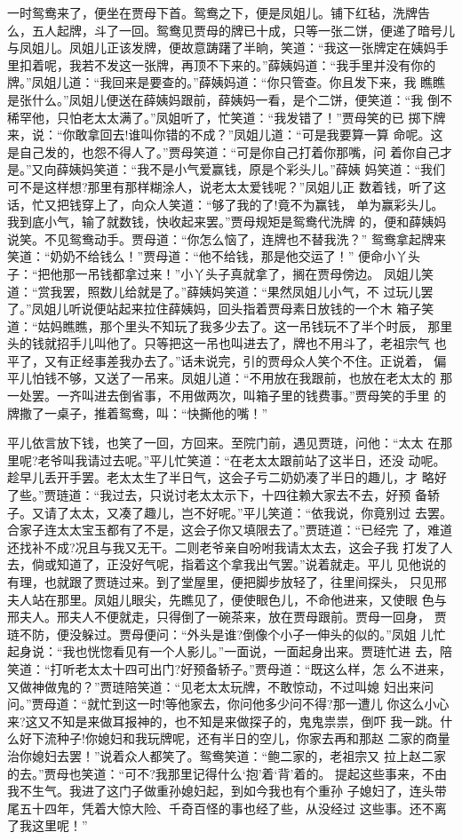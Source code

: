 一时鸳鸯来了，便坐在贾母下首。鸳鸯之下，便是凤姐儿。铺下红毡，洗牌告
么，五人起牌，斗了一回。鸳鸯见贾母的牌已十成，只等一张二饼，便递了暗号儿
与凤姐儿。凤姐儿正该发牌，便故意踌躇了半晌，笑道：“我这一张牌定在姨妈手
里扣着呢，我若不发这一张牌，再顶不下来的。”薛姨妈道：“我手里并没有你的
牌。”凤姐儿道：“我回来是要查的。”薛姨妈道：“你只管查。你且发下来，我
瞧瞧是张什么。”凤姐儿便送在薛姨妈跟前，薛姨妈一看，是个二饼，便笑道：“我
倒不稀罕他，只怕老太太满了。”凤姐听了，忙笑道：“我发错了！”贾母笑的已
掷下牌来，说：“你敢拿回去!谁叫你错的不成？”凤姐儿道：“可是我要算一算
命呢。这是自己发的，也怨不得人了。”贾母笑道：“可是你自己打着你那嘴，问
着你自己才是。”又向薛姨妈笑道：“我不是小气爱赢钱，原是个彩头儿。”薛姨
妈笑道：“我们可不是这样想?那里有那样糊涂人，说老太太爱钱呢？”凤姐儿正
数着钱，听了这话，忙又把钱穿上了，向众人笑道：“够了我的了!竟不为赢钱，
单为赢彩头儿。我到底小气，输了就数钱，快收起来罢。”贾母规矩是鸳鸯代洗牌
的，便和薛姨妈说笑。不见鸳鸯动手。贾母道：“你怎么恼了，连牌也不替我洗？”
鸳鸯拿起牌来笑道：“奶奶不给钱么！”贾母道：“他不给钱，那是他交运了！”
便命小丫头子：“把他那一吊钱都拿过来！”小丫头子真就拿了，搁在贾母傍边。
凤姐儿笑道：“赏我罢，照数儿给就是了。”薛姨妈笑道：“果然凤姐儿小气，不
过玩儿罢了。”凤姐儿听说便站起来拉住薛姨妈，回头指着贾母素日放钱的一个木
箱子笑道：“姑妈瞧瞧，那个里头不知玩了我多少去了。这一吊钱玩不了半个时辰，
那里头的钱就招手儿叫他了。只等把这一吊也叫进去了，牌也不用斗了，老祖宗气
也平了，又有正经事差我办去了。”话未说完，引的贾母众人笑个不住。正说着，
偏平儿怕钱不够，又送了一吊来。凤姐儿道：“不用放在我跟前，也放在老太太的
那一处罢。一齐叫进去倒省事，不用做两次，叫箱子里的钱费事。”贾母笑的手里
的牌撒了一桌子，推着鸳鸯，叫：“快撕他的嘴！”

平儿依言放下钱，也笑了一回，方回来。至院门前，遇见贾琏，问他：“太太
在那里呢?老爷叫我请过去呢。”平儿忙笑道：“在老太太跟前站了这半日，还没
动呢。趁早儿丢开手罢。老太太生了半日气，这会子亏二奶奶凑了半日的趣儿，才
略好了些。”贾琏道：“我过去，只说讨老太太示下，十四往赖大家去不去，好预
备轿子。又请了太太，又凑了趣儿，岂不好呢。”平儿笑道：“依我说，你竟别过
去罢。合家子连太太宝玉都有了不是，这会子你又填限去了。”贾琏道：“已经完
了，难道还找补不成?况且与我又无干。二则老爷亲自吩咐我请太太去，这会子我
打发了人去，倘或知道了，正没好气呢，指着这个拿我出气罢。”说着就走。平儿
见他说的有理，也就跟了贾琏过来。到了堂屋里，便把脚步放轻了，往里间探头，
只见邢夫人站在那里。凤姐儿眼尖，先瞧见了，便使眼色儿，不命他进来，又使眼
色与邢夫人。邢夫人不便就走，只得倒了一碗茶来，放在贾母跟前。贾母一回身，
贾琏不防，便没躲过。贾母便问：“外头是谁?倒像个小子一伸头的似的。”凤姐
儿忙起身说：“我也恍惚看见有一个人影儿。”一面说，一面起身出来。贾琏忙进
去，陪笑道：“打听老太太十四可出门?好预备轿子。”贾母道：“既这么样，怎
么不进来，又做神做鬼的？”贾琏陪笑道：“见老太太玩牌，不敢惊动，不过叫媳
妇出来问问。”贾母道：“就忙到这一时!等他家去，你问他多少问不得?那一遭儿
你这么小心来?这又不知是来做耳报神的，也不知是来做探子的，鬼鬼祟祟，倒吓
我一跳。什么好下流种子!你媳妇和我玩牌呢，还有半日的空儿，你家去再和那赵
二家的商量治你媳妇去罢！”说着众人都笑了。鸳鸯笑道：“鲍二家的，老祖宗又
拉上赵二家的去。”贾母也笑道：“可不?我那里记得什么‘抱’着‘背’着的。
提起这些事来，不由我不生气。我进了这门子做重孙媳妇起，到如今我也有个重孙
子媳妇了，连头带尾五十四年，凭着大惊大险、千奇百怪的事也经了些，从没经过
这些事。还不离了我这里呢！”

